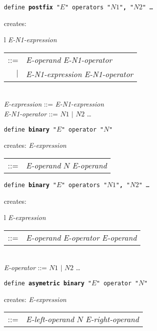 \documentclass[12pt]{article}
\newcommand{\TT}[1]{{\tt \bfseries #1}}
\newenvironment{indpar}[1][0.3in]%
	{\begin{list}{}%
		     {\setlength{\itemsep}{0in}%
		      \setlength{\topsep}{0in}%
		      \setlength{\parsep}{1ex}%
		      \setlength{\labelwidth}{#1}%
		      \setlength{\leftmargin}{#1}%
		      \addtolength{\leftmargin}{\labelsep}}%
	 \item}%
	{\end{list}}
\begin{document}
\begin{indpar}
{\tt define \TT{postfix} "$E$" operators "$N1$"\TT{,} "$N2$" \ldots}
\begin{indpar}
creates: \begin{tabular}[t]{l}
         {\em E-N1-expression} \begin{tabular}[t]{rl}
                            ::= & {\em E-operand} {\em E-N1-operator} \\
                            $|$ & {\em E-N1-expression} {\em E-N1-operator} \\
                            \end{tabular} \\
         {\em E-expression} ::= {\em E-N1-expression} \\
         {\em E-N1-operator} ::= $N1$ $|$ $N2$ \ldots \\
	 \end{tabular}
\end{indpar}

{\tt define \TT{binary} "$E$" operator "$N$"}
\begin{indpar}
creates: {\em E-expression} \begin{tabular}[t]{rl}
                            ::= & {\em E-operand} $N$ {\em E-operand} \\
                            \end{tabular}
\end{indpar}

{\tt define \TT{binary} "$E$" operators "$N1$"\TT{,} "$N2$" \ldots}
\begin{indpar}
creates: \begin{tabular}[t]{l}
         {\em E-expression} \begin{tabular}[t]{rl}
                            ::= & {\em E-operand} {\em E-operator}
			          {\em E-operand} \\
                            \end{tabular} \\
         {\em E-operator} ::= $N1$ $|$ $N2$ \ldots \\
	 \end{tabular}
\end{indpar}

{\tt define \TT{asymetric binary} "$E$" operator "$N$"}
\begin{indpar}
creates: {\em E-expression} \begin{tabular}[t]{rl}
                            ::= & {\em E-left-operand} $N$
			          {\em E-right-operand} \\
                            \end{tabular}
\end{indpar}


\end{indpar}
\end{document}
